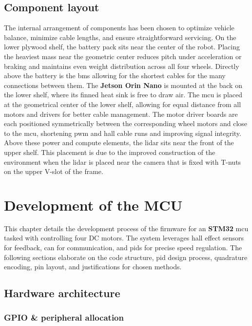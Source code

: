\section{Component layout}\label{sec:component_layout}

The internal arrangement of components has been chosen to optimize vehicle balance, minimize cable lengths, and ensure straightforward servicing. On the lower plywood shelf, the battery pack sits near the center of the robot. Placing the heaviest mass near the geometric center reduces pitch under acceleration or braking and maintains even weight distribution across all four wheels. Directly above the battery is the \gls{bms} allowing for the shortest cables for the many connections between them.
The \textbf{Jetson Orin Nano} is mounted at the back on the lower shelf, where its finned heat sink is free to draw air. The \gls{mcu} is placed at the geometrical center of the lower shelf, allowing for equal distance from all motors and drivers for better cable management. The motor driver boards are each positioned symmetrically between the corresponding wheel motors and close to the \gls{mcu}, shortening \gls{pwm} and \gls{hall} cable runs and improving signal integrity.
Above these power and compute elements, the \gls{lidar} sits near the front of the upper shelf. This placement is due to the improved construction of the environment when the \gls{lidar} is placed near the camera that is fixed with T-nuts on the upper V-slot of the frame.


\chapter{Development of the MCU}\label{chap:mcu}

This chapter details the development process of the firmware for an \textbf{STM32} \gls{mcu} tasked with controlling four DC motors. The system leverages \gls{hall} effect sensors for feedback, \gls{can} for communication, and \glspl{pid} for precise speed regulation. The following sections elaborate on the code structure, \gls{pid} design process, quadrature encoding, pin layout, and justifications for chosen methods.

\section{Hardware architecture}

\subsection{GPIO \& peripheral allocation}

